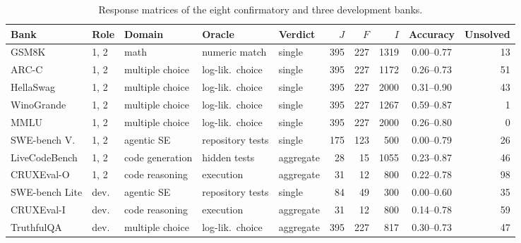 \begin{table}[htbp]
\centering\scriptsize
\caption{Response matrices of the eight confirmatory and three development banks.}
\label{tab:data}
\setlength{\tabcolsep}{2.6pt}
\begin{tabular}{@{}lllllrrrcr@{}}
\toprule
Bank & Role & Domain & Oracle & Verdict & $J$ & $F$ & $I$ & Accuracy & Unsolved \\
\midrule
GSM8K & 1, 2 & math & numeric match & single & 395 & 227 & 1319 & 0.00--0.77 & 13 \\
ARC-C & 1, 2 & multiple choice & log-lik.\ choice & single & 395 & 227 & 1172 & 0.26--0.73 & 51 \\
HellaSwag & 1, 2 & multiple choice & log-lik.\ choice & single & 395 & 227 & 2000 & 0.31--0.90 & 43 \\
WinoGrande & 1, 2 & multiple choice & log-lik.\ choice & single & 395 & 227 & 1267 & 0.59--0.87 & 1 \\
MMLU & 1, 2 & multiple choice & log-lik.\ choice & single & 395 & 227 & 2000 & 0.26--0.80 & 0 \\
SWE-bench V. & 1, 2 & agentic SE & repository tests & single & 175 & 123 & 500 & 0.00--0.79 & 26 \\
LiveCodeBench & 1, 2 & code generation & hidden tests & aggregate & 28 & 15 & 1055 & 0.23--0.87 & 46 \\
CRUXEval-O & 1, 2 & code reasoning & execution & aggregate & 31 & 12 & 800 & 0.22--0.78 & 98 \\
SWE-bench Lite & dev. & agentic SE & repository tests & single & 84 & 49 & 300 & 0.00--0.60 & 35 \\
CRUXEval-I & dev. & code reasoning & execution & aggregate & 31 & 12 & 800 & 0.14--0.78 & 59 \\
TruthfulQA & dev. & multiple choice & log-lik.\ choice & aggregate & 395 & 227 & 817 & 0.30--0.73 & 47 \\
\bottomrule
\end{tabular}
\end{table}

